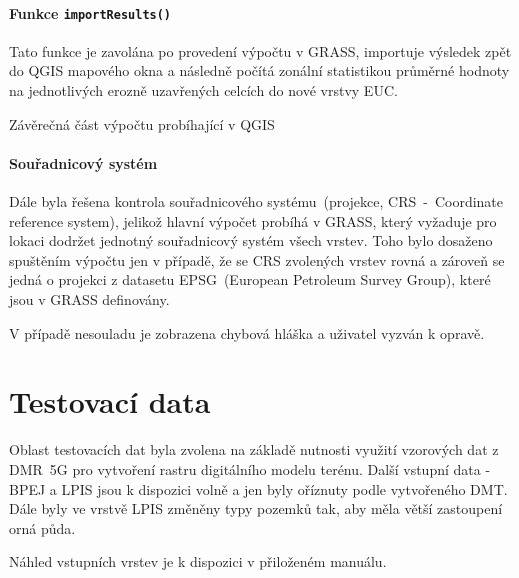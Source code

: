 \paragraph{Funkce \texttt{importResults()}} Tato funkce je zavolána po
provedení výpočtu v GRASS, importuje výsledek zpět do QGIS mapového
okna a následně počítá zonální statistikou průměrné hodnoty na
jednotlivých erozně uzavřených celcích do nové vrstvy EUC.
\begin{algorithm}
\caption{Závěrečná část výpočtu probíhající v QGIS}
\label{alg:onAddKFactor}
    \begin{algorithmic}[1] 
   
    \end{algorithmic}
\end{algorithm}

\paragraph{Souřadnicový systém} Dále byla řešena kontrola
souřadnicového systému~(projekce, CRS~-~Coordinate reference system),
jelikož hlavní výpočet probíhá v GRASS, který vyžaduje pro lokaci
dodržet jednotný souřadnicový systém všech vrstev. Toho bylo dosaženo
spuštěním výpočtu jen v případě, že se CRS zvolených vrstev rovná a
zároveň se jedná o projekci z datasetu EPSG~(European Petroleum Survey
Group), které jsou v GRASS definovány.

V případě nesouladu je zobrazena chybová hláška a uživatel vyzván k
opravě.

\section{Testovací data} Oblast testovacích dat byla zvolena na
základě nutnosti využití vzorových dat z DMR~5G pro vytvoření rastru
digitálního modelu terénu. Další vstupní data - BPEJ a LPIS jsou k
dispozici volně a jen byly oříznuty podle vytvořeného DMT. Dále byly
ve vrstvě LPIS změněny typy pozemků tak, aby měla větší zastoupení
orná půda.

Náhled vstupních vrstev je k dispozici v přiloženém manuálu.

